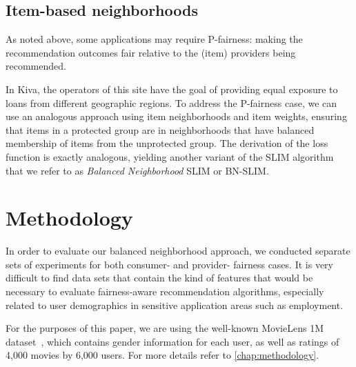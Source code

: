 \subsection{Item-based neighborhoods}

As noted above, some applications may require P-fairness: making the recommendation outcomes fair relative to the (item) providers being recommended. 

In Kiva, the operators of this site have the goal of providing equal exposure to loans from different geographic regions. To address the P-fairness case, we can use an analogous approach using item neighborhoods and item weights, ensuring that items in a protected group are in neighborhoods that have balanced membership of items from the unprotected group. The derivation of the loss function is exactly analogous, yielding another variant of the SLIM algorithm that we refer to as \textit{Balanced Neighborhood} SLIM or BN-SLIM.



\section{Methodology}

In order to evaluate our balanced neighborhood approach, we conducted separate sets of experiments for both consumer- and provider- fairness cases. It is very difficult to find data sets that contain the kind of features that would be necessary to evaluate fairness-aware recommendation algorithms, especially related to user demographics in sensitive application areas such as employment. 

For the purposes of this paper, we are using the well-known MovieLens 1M dataset~\cite{movielens}, which contains gender information for each user, as well as ratings of 4,000 movies by 6,000 users. For more details refer to \ref{chap:methodology}.


